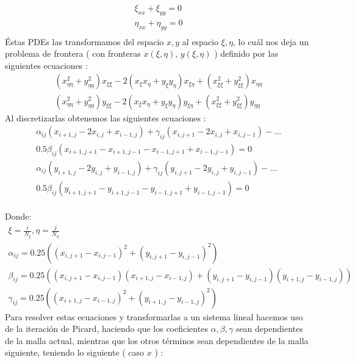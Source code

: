 \documentclass{article}
\begin{document}
\begin{enumerate}
\begin{itemize}
\begin{itemize}
		\begin{gather*}
			\xi_{xx} + \xi_{yy} = 0 \\
			\eta_{xx} + \eta_{yy} = 0 \\
		\end{gather*}
		\'Estas PDEs las transformamos del espacio $x,y$ al espacio $\xi, \eta$, lo cu\'al nos deja un problema de frontera ( con fronteras $x(\xi,\eta)$, $y(\xi,\eta)$ ) definido por las siguientes ecuaciones :
		\begin{gather*}
			( x_{\eta \eta}^{2} + y_{\eta \eta}^{2} )x_{\xi \xi} 
				- 2 ( x_{\xi} x_{\eta} + y_{\xi} y_{\eta} ) x_{\xi \eta}
				+ ( x_{\xi \xi}^{2} + y_{\xi \xi}^{2} )x_{\eta \eta} 
			\\
			( x_{\eta \eta}^{2} + y_{\eta \eta}^{2} )y_{\xi \xi} 
				- 2 ( x_{\xi} x_{\eta} + y_{\xi} y_{\eta} ) y_{\xi \eta}
				+ ( x_{\xi \xi}^{2} + y_{\xi \xi}^{2} )y_{\eta \eta} 
		\end{gather*}
		Al discretizarlas obtenemos las siguientes ecuaciones :
		\begin{gather*}
			\alpha_{ij} ( x_{i+1,j} - 2 x_{i,j} + x_{i-1,j} ) + \gamma_{ij} ( x_{i, j + 1} - 2 x_{i, j} + x_{i,j-1} ) - \hdots \\
				 0.5 \beta_{ij} ( x_{i+1,j+1} - x_{i+1,j-1} - x_{i-1,j+1} + x_{i-1,j-1} ) = 0
			\\
			\alpha_{ij} ( y_{i+1,j} - 2 y_{i,j} + y_{i-1,j} ) + \gamma_{ij} ( y_{i, j + 1} - 2 y_{i, j} + y_{i,j-1} ) - \hdots \\
				 0.5 \beta_{ij} ( y_{i+1,j+1} - y_{i+1,j-1} - y_{i-1,j+1} + y_{i-1,j-1} ) = 0
		\end{gather*}
		\\
		Donde:
		\begin{gather*}
			 \xi = \frac{i}{N_{\xi}},\eta = \frac{j}{N_{\eta}}
			 \\
			 \alpha_{ij} = 0.25 ( ( x_{i,j+1} - x_{i,j-1} )^{2} + (y_{i,j+1} - y_{i,j-1})^{2} )
			 \\
			 \beta_{ij} = 0.25 ( ( x_{i,j+1} - x_{i,j-1} ) ( x_{i+1,j} - x_{i-1,j} ) + ( y_{i,j+1} - y_{i,j-1} ) ( y_{i+1,j} - y_{i-1,j} ) )
			 \\
			 \gamma_{ij} = 0.25 ( ( x_{i+1,j} - x_{i-1,j} )^{2} + (y_{i+1,j} - y_{i-1,j})^{2} )
		\end{gather*}
		Para resolver estas ecuaciones y transformarlas a un sistema lineal hacemos uso de la iteraci\'on de Picard, haciendo que los coeficientes $\alpha, \beta, \gamma$
		sean dependientes de la malla actual, mientras que los otros t\'erminos sean dependientes de la malla siguiente, teniendo lo siguiente ( caso $x$ ) :

\end{itemize}
\end{itemize}
\end{enumerate}
\end{document}
